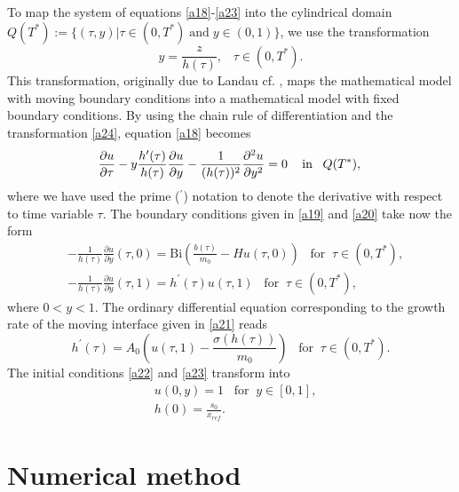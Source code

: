 \documentclass{article}
\begin{document}
To map the system  of equations \eqref{a18}-\eqref{a23} into the  cylindrical domain $Q(T^*) := \{ (\tau, y) | \tau \in (0, T^*) \; \text{and}\; y \in (0, 1)\}$, we use the transformation 
\begin{equation}
\label{a24}y = \frac{z }{h(\tau)},\;\;\; \tau \in (0, T^*).
\end{equation}
This transformation, originally due to Landau cf. \cite{landau1950heat}, maps the mathematical model with  moving boundary
conditions  into a mathematical model with fixed boundary conditions. By using the chain rule of differentiation and the transformation \eqref{a24}, equation \eqref{a18} becomes
\begin{equation}
\label{a32} 
\displaystyle\frac{\partial{u}}{\partial{\tau}} - y\frac{h^{\prime}(\tau)}{h(\tau)}  \frac{\partial{u}}{\partial{y}}- \frac{1}{(h(\tau))^2}\frac{\partial^2{u}}{\partial{y^2}} = 0
\;\;\; \ \text{in}\;\;\;Q(T^*),\\
\end{equation}
where we have used the prime ($^\prime$) notation to denote the derivative with
respect to time variable $\tau$.
The boundary conditions given in  \eqref{a19} and \eqref{a20} take now the form 
\begin{align} 
\label{a33} &- \frac{1}{h(\tau)} \frac{\partial u}{\partial y}(\tau, 0) = \text{Bi}\left(\frac{b(\tau)}{m_{0}}- Hu(\tau, 0)\right)\;\;\; \text{for}\;\; \tau\in(0, T^*), \\
\label{a34}&- \frac{1}{h(\tau)} \frac{\partial u}{\partial y}(\tau, 1) =  h^{\prime}(\tau)u(\tau, 1) \;\;\; \text{for}\;\; \tau\in(0, T^*), 
\end{align}
where $0<y<1.$
The ordinary differential equation corresponding to the  growth rate of the moving interface given in \eqref{a21} reads
\begin{equation}
\label{a35} h^{\prime}(\tau) =A_0\left(u(\tau, 1)-\frac{\sigma(h(\tau))}{m_{0}}\right)\;\;\; \text{for}\;\; \tau\in(0, T^*).
\end{equation}
The initial conditions  \eqref{a22} and \eqref{a23} transform into
\begin{align}
\label{a36} &u(0, y)  = 1 \;\;\; \text{for}\;\; y\in[0, 1], \\
\label{a37}&h(0) = \frac{s_0}{x_{ref}}.
\end{align}

\section{Numerical method}\label{FEM}
\end{document}
